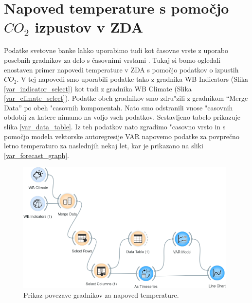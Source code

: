 \section{Napoved temperature s pomočjo $CO_2$ izpustov v ZDA}


Podatke svetovne banke lahko uporabimo tudi kot časovne vrste z uporabo
posebnih gradnikov za delo s časovnimi vrstami \cite{time_series}. Tukaj si
bomo ogledali enostaven primer napovedi temperature v ZDA s pomočjo podatkov o
izpustih $CO_2$. V tej napovedi smo uporabili podatke tako z gradnika 
WB Indicators (Slika \ref{var_indicator_select})
kot tudi z gradnika WB Climate (Slika \ref{var_climate_select}). Podatke obeh
gradnikov smo zdru"zili z gradnikom ``Merge Data'' po obeh "casovnih
komponentah. Nato smo odstranili vnose "casovnih obdobij za katere nimamo na
voljo vseh podatkov. Sestavljeno tabelo prikazuje slika \ref{var_data_table}.
Iz teh podatkov nato zgradimo "casovno vrsto in s pomočjo modela vektorske 
autoregresije VAR \cite{var_model} napovemo podatke za povprečno 
letno temperaturo za naslednjih nekaj let, kar je prikazano na sliki 
\ref{var_forecast_graph}.

\begin{figure}
\begin{center}
\includegraphics[width=11cm]{pic/var_setup.png}
\end{center}
\caption{Prikaz povezave gradnikov za napoved temperature.}
\label{var_setup}
\end{figure} 


